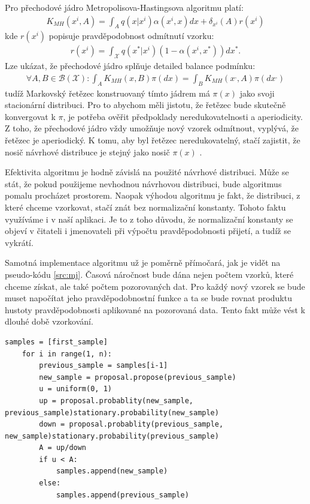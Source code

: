 \documentclass[czech,master,public,dept470,male,cpdeclaration,oneside, python]{diploma}
\begin{document}
Pro přechodové jádro Metropolisova-Hastingsova algoritmu platí:
\begin{align}\nonumber
K_{MH}(x^i, A) = \int_A q(x | x^i) \alpha(x^i, x)dx + \delta_{x^i}(A)r(x^{i}) 
\end{align}
kde $r(x^i)$ popisuje pravděpodobnost odmítnutí vzorku:
\begin{align}\nonumber
r(x^i) = \int_{\mathcal{X}} q(x^* | x^i)(1 - \alpha(x^i, x^*))dx^*.
\end{align}
Lze ukázat, že přechodové jádro splňuje detailed balance podmínku\cite{robert2004monte}:
\begin{align}\nonumber
	\forall A,B \in \mathcal{B}(\mathcal{X}):	\int_A K_{MH}(x, B)\pi(dx) = \int_B K_{MH}(x^{,}, A)\pi(dx^{,}) 
\end{align}
tudíž Markovský řetězec konstruovaný tímto jádrem má $\pi(x)$ jako svoji stacionární distribuci. Pro to abychom měli jistotu, že řetězec bude skutečně konvergovat k $\pi$, je potřeba ověřit předpoklady neredukovatelnosti a aperiodicity. Z toho, že přechodové jádro vždy umožňuje nový vzorek odmítnout, vyplývá, že řetězec je aperiodický. K tomu, aby byl řetězec neredukovatelný, stačí zajistit, že nosič návrhové distribuce je stejný jako nosič  $\pi(x)$ \cite{andrieu2003introduction}. \par 
Efektivita algoritmu je hodně závislá na použité návrhové distribuci. Může se stát, že pokud použijeme nevhodnou návrhovou distribuci, bude algoritmus pomalu procházet prostorem. Naopak výhodou algoritmu je fakt, že distribuci, z které chceme vzorkovat, stačí znát bez normalizační konstanty. Tohoto faktu využíváme i v naší aplikaci. Je to z toho důvodu, že normalizační konstanty se objeví v čitateli i jmenovateli při výpočtu pravděpodobnosti přijetí, a tudíž se vykrátí. \par
Samotná implementace algoritmu už je poměrně přímočará, jak je vidět na pseudo-kódu \ref{src:mj}. Časová náročnost bude dána nejen počtem vzorků, které chceme získat, ale také počtem pozorovaných dat. Pro každý nový vzorek se bude muset napočítat jeho pravděpodobnostní funkce a ta se bude rovnat produktu hustoty pravděpodobnosti aplikované na pozorovaná data. Tento fakt může vést k dlouhé době vzorkování.

\begin{lstlisting}[label=src:mj,caption=Metropoli-Hastings]
	samples = [first_sample]
	for i in range(1, n):
		previous_sample = samples[i-1]
		new_sample = proposal.propose(previous_sample)
		u = uniform(0, 1)
		up = proposal.probablity(new_sample, previous_sample)stationary.probability(new_sample)
		down = proposal.probablity(previous_sample, new_sample)stationary.probability(previous_sample)
		A = up/down
	    if u < A:
	    	samples.append(new_sample)
   		else:
   			samples.append(previous_sample)
\end{lstlisting}
\end{document}
